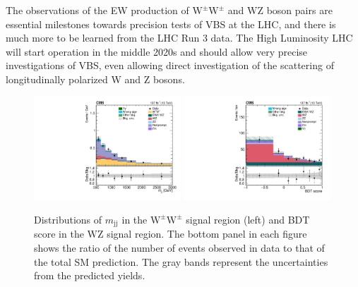 \documentclass[12pt]{article}
\newcommand{\WZ}{\ensuremath{\mathrm{W}\mathrm{Z}}}
\newcommand{\WW}{\ensuremath{\mathrm{W}^\pm\mathrm{W}^\pm}}
\newcommand{\jet}{\ensuremath{\mathrm{j}}}
\newcommand{\mjj}{\ensuremath{m_{\jet\jet}}}
\begin{document}
The observations of the EW production of $\WW$ and $\WZ$ boson pairs are essential milestones towards precision tests of VBS at the LHC, and there is much more to be learned from the LHC Run 3 data. The High Luminosity LHC will start operation in the middle 2020s and should allow very precise investigations of VBS, even allowing direct investigation of the scattering of longitudinally polarized W and Z bosons. 

\begin{figure}[htb]
\centering
\includegraphics[width=0.49\textwidth]{figures/ssww_wwsel_mjj_2019.pdf}
\includegraphics[width=0.49\textwidth]{figures/ssww_wzsel_bdt_2019.pdf}
\caption{Distributions of $\mjj$ in the $\WW$ signal region (left) and  BDT score in the $\WZ$ signal region. The bottom panel in each figure
shows the ratio of the number of events observed in data to that of the total SM prediction. The gray bands represent the uncertainties from the predicted yields.}
\label{fig:signal}
\end{figure}
\end{document}
